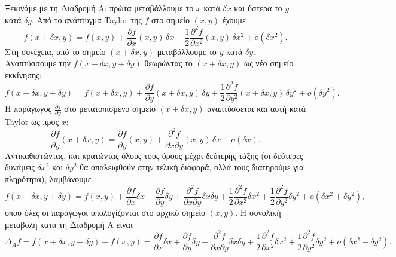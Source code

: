 \documentclass[11pt,a4paper,twoside,openright]{book}
\begin{document}
Ξεκινάμε με τη Διαδρομή Α: πρώτα μεταβάλλουμε το \(x\) κατά \(\delta x\) και ύστερα το \(y\) κατά \(\delta y\). Από το ανάπτυγμα Taylor της \(f\) στο σημείο \((x,y)\) έχουμε
\begin{equation}
f(x+\delta x, y) = f(x,y) + \frac{\partial f}{\partial x}(x,y) \, \delta x + \frac{1}{2} \frac{\partial^2 f}{\partial x^2}(x,y) \, \delta x^2 + o(\delta x^2).
\end{equation}
Στη συνέχεια, από το σημείο \((x+\delta x, y)\) μεταβάλλουμε το \(y\) κατά \(\delta y\). Αναπτύσσουμε την \(f(x+\delta x, y+\delta y)\) θεωρώντας το \((x+\delta x, y)\) ως νέο σημείο εκκίνησης:
\begin{equation}
f(x+\delta x, y+\delta y) = f(x+\delta x, y) + \frac{\partial f}{\partial y}(x+\delta x, y) \, \delta y + \frac{1}{2} \frac{\partial^2 f}{\partial y^2}(x+\delta x, y) \, \delta y^2 + o(\delta y^2).
\end{equation}
Η παράγωγος \(\frac{\partial f}{\partial y}\) στο μετατοπισμένο σημείο \((x+\delta x, y)\) αναπτύσσεται και αυτή κατά Taylor ως προς \(x\):
\begin{equation}
\frac{\partial f}{\partial y}(x+\delta x, y) = \frac{\partial f}{\partial y}(x,y) + \frac{\partial^2 f}{\partial x \partial y}(x,y) \, \delta x + o(\delta x).
\end{equation}
Αντικαθιστώντας, και κρατώντας όλους τους όρους μέχρι δεύτερης τάξης (οι δεύτερες δυνάμεις \(\delta x^2\) και \(\delta y^2\) θα απαλειφθούν στην τελική διαφορά, αλλά τους διατηρούμε για πληρότητα), λαμβάνουμε
\begin{equation}
f(x+\delta x, y+\delta y) = f(x,y) + \frac{\partial f}{\partial x} \delta x + \frac{\partial f}{\partial y} \delta y + \frac{\partial^2 f}{\partial x \partial y} \delta x \delta y + \frac{1}{2} \frac{\partial^2 f}{\partial x^2} \delta x^2 + \frac{1}{2} \frac{\partial^2 f}{\partial y^2} \delta y^2 + o(\delta x^2 + \delta y^2),
\end{equation}
όπου όλες οι παράγωγοι υπολογίζονται στο αρχικό σημείο \((x,y)\). Η συνολική μεταβολή κατά τη Διαδρομή Α είναι
\begin{equation}
\Delta_A f = f(x+\delta x, y+\delta y) - f(x,y) = \frac{\partial f}{\partial x} \delta x + \frac{\partial f}{\partial y} \delta y + \frac{\partial^2 f}{\partial x \partial y} \delta x \delta y + \frac{1}{2} \frac{\partial^2 f}{\partial x^2} \delta x^2 + \frac{1}{2} \frac{\partial^2 f}{\partial y^2} \delta y^2 + o(\delta x^2 + \delta y^2).
\end{equation}
\end{document}
